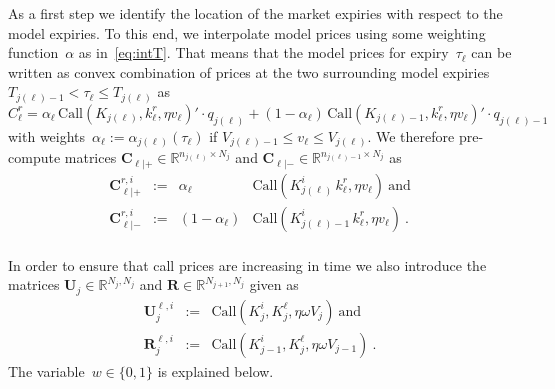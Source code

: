 \documentclass[twoside]{article}
\DeclareRobustCommand{\R}{\mathbb{R}}
\theoremstyle{plain}
\theoremstyle{definition}
\theoremstyle{remark}
\begin{document}
As a first step we identify the location of the market expiries with respect to the model expiries.
To this end, we interpolate model prices using some weighting function~$\alpha$ as in~\eqref{eq:intT}.
That means that the model prices for expiry~$\tau_\ell$ can be written
as convex combination of prices at the two surrounding model expiries $T_{j(\ell)-1}<\tau_\ell\leq T_{j(\ell)}$ as
$$
    C^r_\ell = \alpha_\ell\, \mathrm{Call}( K_{j(\ell)},k^r_\ell,\eta v_\ell)' \cdot q_{j(\ell)}
             + (1-\alpha_\ell)\,  \mathrm{Call}( K_{j(\ell)-1},k^r_\ell,\eta v_\ell)' \cdot q_{j(\ell)-1}
$$
with weights~$\alpha_\ell := \alpha_{j(\ell)}(\tau_\ell)$
if $V_{j(\ell)-1}\leq v_\ell \leq V_{j(\ell)}$.
We therefore pre-compute matrices $\mathbf{C}_{\ell|+} \in \R^{n_{j(\ell)}\times N_j}$
and $\mathbf{C}_{\ell|-} \in \R^{n_{j(\ell)-1}\times N_j}$
as
\begin{equation}\label{eq:imp_matrixes_market}
\begin{array}{llrl}
    \mathbf{C}_{\ell|+}^{r,i} & := & \alpha_\ell & \mathrm{Call}( K^i_{j(\ell)}\, k^r_\ell, \eta v_\ell )  \ \mbox{and} \\
    \mathbf{C}_{\ell|-}^{r,i} & := & (1-\alpha_\ell ) & \mathrm{Call}( K^i_{j(\ell)-1}\, k^r_\ell, \eta v_\ell )  \ . \\
\end{array}
\end{equation}

In order to ensure that call prices are increasing in time 
we also introduce the matrices $\mathbf{U}_j\in\R^{N_j,N_j}$ and $\mathbf{R}\in\R^{N_{j+1},N_j}$
given as
\begin{equation}\label{eq:imp_matrixes}
\begin{array}{lll}
    \mathbf{U}_j^{\ell,i} & := & \mathrm{Call}( K^i_j, K^\ell_j, \eta\omega V_j ) \ \mbox{and} \\
    \mathbf{R}_j^{\ell,i} & := & \mathrm{Call}( K^i_{j-1}, K^\ell_j, \eta\omega V_{j-1} ) \ .
\end{array}
\end{equation}
The variable~$w\in\{0,1\}$ is explained below.
\end{document}
